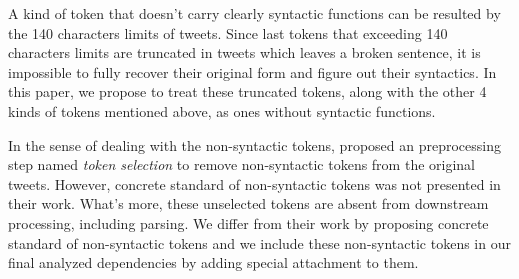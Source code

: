 \documentclass[11pt,letterpaper]{article}
\begin{document}
A kind of token that doesn't carry clearly syntactic functions can be resulted by the 140 characters limits of tweets.
Since last tokens that exceeding 140 characters limits are truncated in tweets which leaves a broken sentence, it is impossible to fully recover their original form and figure out their syntactics.
In this paper, we propose to treat these truncated tokens, along with the other 4 kinds of tokens mentioned above, as ones without syntactic functions.

In the sense of dealing with the non-syntactic tokens,  proposed an preprocessing step named {\it token selection} to remove non-syntactic tokens from the original tweets.
However, concrete standard of non-syntactic tokens was not presented in their work.
What's more, these unselected tokens are absent from downstream processing, including parsing.
We differ from their work by proposing concrete standard of non-syntactic tokens and we include these non-syntactic tokens in our final analyzed dependencies by adding special attachment to them.
\end{document}
